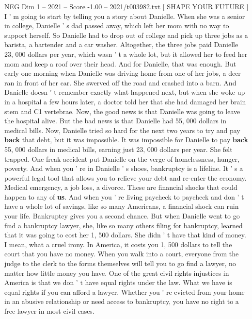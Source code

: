 \begin{textsample}{NEG Dim 1 – 2021 – Score -1.00 – 2021/t003982.txt}  \label{ex:f1_neg_021}
[ SHAPE YOUR FUTURE ] I ' m going to start by telling you a story about Danielle.
When she was a senior in college, Danielle ' s dad passed away, which left her mom with no way to support herself.
So Danielle had to drop out of college and pick up three jobs as a barista, a bartender and a car washer.
Altogether, the three jobs paid Danielle 23, 000 dollars per year, which wasn ' t a whole lot, but it allowed her to feed her mom and keep a roof over their head.
And for Danielle, that was enough.
But early one morning when Danielle was driving home from one of her jobs, a deer ran in front of her car.
She swerved off the road and crashed into a barn.
And Danielle doesn ' t remember exactly what happened next, but when she woke up in a hospital a few hours later, a doctor told her that she had damaged her brain stem and C1 vertebrae.
Now, the good news is that Danielle was going to leave the hospital alive.
But the bad news is that Danielle had 55, 000 dollars in medical bills.
Now, Danielle tried so hard for the next two years to try and pay \textbf{back} that debt, but it was impossible.
It was impossible for Danielle to pay \textbf{back} 55, 000 dollars in medical bills, earning just 23, 000 dollars per year.
She felt trapped.
One freak accident put Danielle on the verge of homelessness, hunger, poverty.
And when you ' re in Danielle ' s shoes, bankruptcy is a lifeline.
It ' s a powerful legal tool that allows you to relieve your debt and re-enter the economy.
Medical emergency, a job loss, a divorce.
These are financial shocks that could happen to any of \textbf{us}.
And when you ' re living paycheck to paycheck and don ' t have a whole lot of savings, like so many Americans, a financial shock can ruin your life.
Bankruptcy gives you a second chance.
But when Danielle went to go find a bankruptcy lawyer, she, like so many others filing for bankruptcy, learned that it was going to cost her 1, 500 dollars.
She didn ' t have that kind of money.
I mean, what a cruel irony.
In America, it costs you 1, 500 dollars to tell the court that you have no money.
When you walk into a court, everyone from the judge to the clerk to the forms themselves will tell you to go find a lawyer, no matter how little money you have.
One of the great civil rights injustices in America is that we don ' t have equal rights under the law.
What we have is equal rights if you can afford a lawyer.
Whether you ' re evicted from your home in an abusive relationship or need access to bankruptcy, you have no right to a free lawyer in most civil cases.

\end{textsample}
